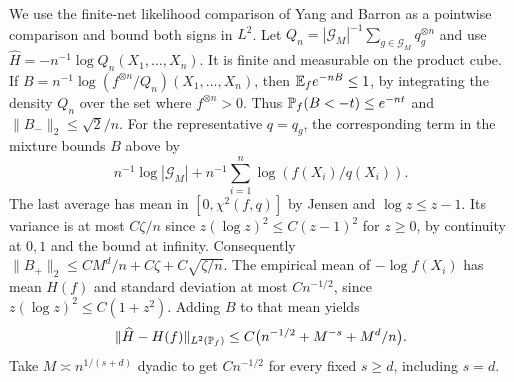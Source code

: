 We use the finite-net likelihood comparison of Yang and Barron
\cite[Section~2, equation (2)]{YangBarron} as a pointwise
comparison and bound both signs in \(L^2\). Let
\(Q_n=|\mathcal G_M|^{-1}\sum_{g\in\mathcal G_M} q_g^{\otimes n}\)
and use \(\widehat H=-n^{-1}\log Q_n(X_1,\ldots,X_n)\).
It is finite and measurable on the product cube. If
\(B=n^{-1}\log(f^{\otimes n}/Q_n)(X_1,\ldots,X_n)\), then
\(\mathbb E_f e^{-nB}\le1\), by integrating the density \(Q_n\)
over the set where \(f^{\otimes n}>0\). Thus
\(\mathbb P_f(B<-t)\le e^{-nt}\) and \(\|B_-\|_2\le \sqrt{2}/n\).
For the representative \(q=q_g\), the corresponding term
in the mixture bounds \(B\) above by
\[
 n^{-1}\log|\mathcal G_M|
 +n^{-1}\sum_{i=1}^n\log(f(X_i)/q(X_i)).
\]
The last average has mean in \([0,\chi^2(f,q)]\) by Jensen
and \(\log z\le z-1\). Its variance is at most \(C\zeta/n\)
since \(z(\log z)^2\le C(z-1)^2\) for \(z\ge0\), by
continuity at \(0,1\) and the bound at infinity. Consequently
\(\|B_+\|_2\le CM^d/n+C\zeta+C\sqrt{\zeta/n}\).
The empirical mean of \(-\log f(X_i)\) has mean \(H(f)\)
and standard deviation at most \(Cn^{-1/2}\), since
\(z(\log z)^2\le C(1+z^2)\). Adding \(B\) to that mean yields
\[
 \|\widehat H-H(f)\|_{L^2(\mathbb P_f)}
 \le C\bigl(n^{-1/2}+M^{-s}+M^d/n\bigr).
\]
Take \(M\asymp n^{1/(s+d)}\) dyadic to get \(Cn^{-1/2}\)
for every fixed \(s\ge d\), including \(s=d\).
